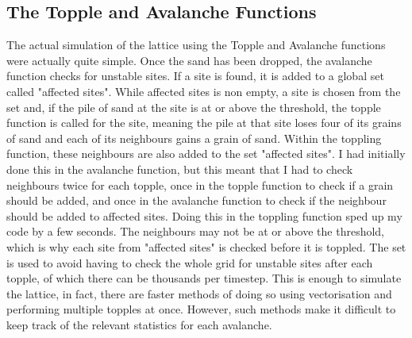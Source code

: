 \documentclass{article}
\begin{document}
\subsection{The Topple and Avalanche Functions}
The actual simulation of the lattice using the Topple and Avalanche functions were actually quite simple. Once the sand has been dropped, the avalanche function checks for unstable sites. If a site is found, it is added to a global set called "affected sites". While affected sites is non empty, a site is chosen from the set and, if the pile of sand at the site is at or above the threshold, the topple function is called for the site, meaning the pile at that site loses four of its grains of sand and each of its neighbours gains a grain of sand. Within the toppling function, these neighbours are also added to the set "affected sites". I had initially done this in the avalanche function, but this meant that I had to check neighbours twice for each topple, once in the topple function to check if a grain should be added, and once in the avalanche function to check if the neighbour should be added to affected sites. Doing this in the toppling function sped up my code by a few seconds. The neighbours may not be at or above the threshold, which is why each site from "affected sites" is checked before it is toppled. The set is used to avoid having to check the whole grid for unstable sites after each topple, of which there can be thousands per timestep. This is enough to simulate the lattice, in fact, there are faster methods of doing so using vectorisation and performing multiple topples at once. However, such methods make it difficult to keep track of the relevant statistics for each avalanche.
\end{document}
